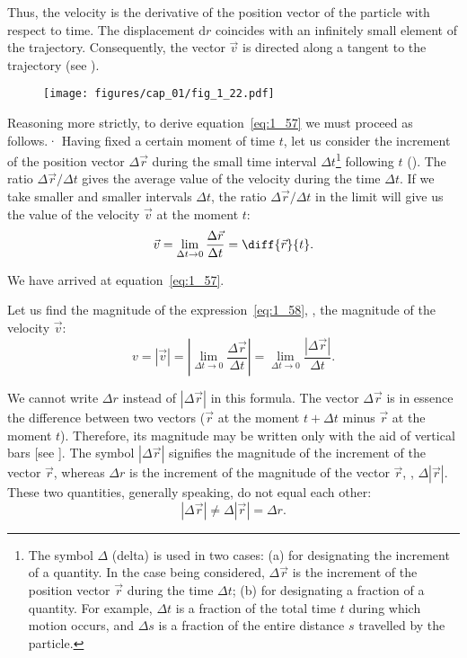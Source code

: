 \noindent
Thus, the velocity is the derivative of the position vector of the particle with respect to time. The displacement $\mathrm{d}r$ coincides with an infinitely small element of the trajectory. Consequently, the vector $\vec{v}$ is directed along a tangent to the trajectory (see ).

\begin{figure}[t]
	\begin{center}
		\texttt{[image: figures/cap\_01/fig\_1\_22.pdf]}
		\caption[]{}
		\label{fig:1_22}
	\end{center}
\vspace{-0.7cm}
\end{figure}

Reasoning more strictly, to derive equation~\eqref{eq:1_57} we must proceed as follows.· Having fixed a certain moment of time $t$, let us consider the increment of the position vector $\Delta\vec{r}$ during the small time interval $\Delta t$\footnote{The symbol $\Delta$ (delta) is used in two cases: (a) for designating the increment of a quantity. In the case being considered, $\Delta\vec{r}$ is the increment of the position vector $\vec{r}$ during the time $\Delta t$; (b) for designating a fraction of a quantity. For example, $\Delta t$ is a fraction of the total time $t$ during which motion occurs, and $\Delta s$ is a fraction of the entire 	distance $s$ travelled by the particle.} following $t$ (). The ratio $\Delta\vec{r}/\Delta t$ gives the average value of the velocity during the time $\Delta t$. If we take smaller and smaller intervals $\Delta t$, the ratio $\Delta\vec{r}/\Delta t$ in the limit will give us the value of the velocity $\vec{v}$ at the moment $t$:
\begin{equation}\label{eq:1_58}
\vec{v} = \lim_{\Delta t\to 0} \frac{\Delta\vec{r}}{\Delta t} = \diff{\vec{r}}{t}.
\end{equation}

\noindent
We have arrived at equation~\eqref{eq:1_57}.

Let us find the magnitude of the expression~\eqref{eq:1_58}, \ie, the magnitude of the velocity $\vec{v}$:
\begin{equation}\label{eq:1_59}
v = |\vec{v}| = \left|\lim_{\Delta t\to 0} \frac{\Delta\vec{r}}{\Delta t}\right| = \lim_{\Delta t\to 0} \frac{|\Delta\vec{r}|}{\Delta t}.
\end{equation}

\noindent
We cannot write $\Delta r$ instead of $|\Delta\vec{r}|$ in this formula. The vector $\Delta\vec{r}$ is in essence the difference between two vectors ($\vec{r}$ at the moment $t+\Delta t$ minus $\vec{r}$ at the moment $t$). Therefore, its magnitude may be written only with the aid of vertical
bars [see ]. The symbol $|\Delta\vec{r}|$ signifies the magnitude of the increment of the vector $\vec{r}$, whereas $\Delta r$ is the increment of the magnitude of the vector $\vec{r}$, \ie, $\Delta|\vec{r}|$. These two quantities, generally speaking, do not equal each other:
\begin{equation*}
|\Delta\vec{r}| \neq \Delta|\vec{r}| = \Delta r.
\end{equation*}


